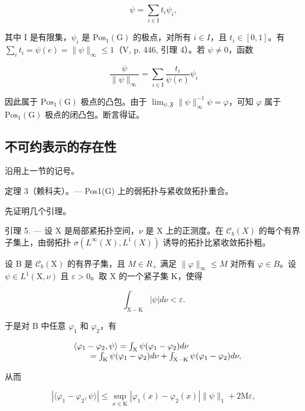 \[
\psi = \sum_ {i \in \mathrm{I}} t _ {i} \psi_ {i},
\]

其中 I 是有限集，\(\psi_{i}\) 是 \(\mathrm{Pos}_{1}(\mathrm{G})\) 的极点，对所有 \(i \in I\)，且 \(t_{i} \in [0,1]\)。有 \(\sum_{i} t_{i} = \psi(e) = \|\psi\|_{\infty} \leqslant 1\)（V, p. 446, 引理 4）。若 \(\psi \neq 0\)，函数

\[
\frac {\psi}{\| \psi \| _ {\infty}} = \sum_ {i \in \mathrm{I}} \frac {t _ {i}}{\psi (e)} \psi_ {i}
\]

因此属于 \(\mathrm{Pos}_{1}(\mathrm{G})\) 极点的凸包。由于 \(\lim_{\psi,\mathfrak{F}}\|\psi\|_{\infty}^{-1}\psi=\varphi\)，可知 \(\varphi\) 属于 \(\mathrm{Pos}_{1}(\mathrm{G})\) 极点的闭凸包。断言得证。

\subsection{不可约表示的存在性}

沿用上一节的记号。

定理 3（赖科夫）。--- Pos1(G) 上的弱拓扑与紧收敛拓扑重合。

先证明几个引理。

引理 5. --- 设 X 是局部紧拓扑空间，\(\nu\) 是 X 上的正测度。在 \(\mathcal{C}_{b}(X)\) 的每个有界子集上，由弱拓扑 \(\sigma(L^{\infty}(X), L^{1}(X))\) 诱导的拓扑比紧收敛拓扑粗。

设 B 是 \(\mathcal{C}_{b}(\mathrm{X})\) 的有界子集，且 \(M \in R_{+}\) 满足 \(\|\varphi\|_{\infty} \leqslant M\) 对所有 \(\varphi \in B\)。设 \(\psi \in L^{1}(\mathrm{X}, \nu)\) 且 \(\varepsilon > 0\)。取 X 的一个紧子集 K，使得

\[
\int_ {\mathrm{X-K}} | \psi | d \nu <   \varepsilon .
\]

于是对 B 中任意 \(\varphi_{1}\) 和 \(\varphi_{2}\)，有

\[
\begin{array}{r l} & {\langle \varphi_ {1} - \varphi_ {2}, \psi \rangle = \int_ {\mathrm{X}} \psi (\varphi_ {1} - \varphi_ {2}) d \nu} \\ & {\qquad = \int_ {\mathrm{K}} \psi (\varphi_ {1} - \varphi_ {2}) d \nu + \int_ {\mathrm{X-K}} \psi (\varphi_ {1} - \varphi_ {2}) d \nu ,} \end{array}
\]

从而

\[
| \langle \varphi_ {1} - \varphi_ {2}, \psi \rangle | \leqslant \sup _ {x \in \mathrm{K}} | \varphi_ {1} (x) - \varphi_ {2} (x) | \| \psi \| _ {1} + 2 \mathrm{M} \varepsilon ,
\]

